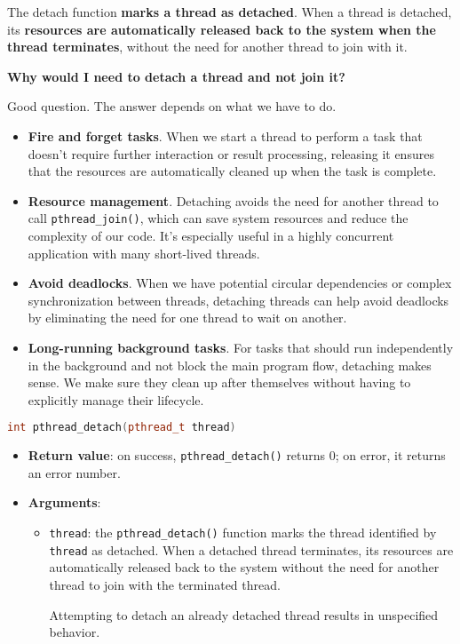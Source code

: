 The detach function \textbf{marks a thread as detached}. When a thread is detached, its \textbf{resources are automatically released back to the system when the thread terminates}, without the need for another thread to join with it.
\begin{flushleft}
    \textcolor{Green3}{ \textbf{Why would I need to detach a thread and not join it?}}
\end{flushleft}
Good question. The answer depends on what we have to do.
\begin{itemize}
    \item \textbf{Fire and forget tasks}. When we start a thread to perform a task that doesn't require further interaction or result processing, releasing it ensures that the resources are automatically cleaned up when the task is complete.

    \item \textbf{Resource management}. Detaching avoids the need for another thread to call \texttt{pthread\_join()}, which can save system resources and reduce the complexity of our code. It's especially useful in a highly concurrent application with many short-lived threads.
    
    \item \textbf{Avoid deadlocks}. When we have potential circular dependencies or complex synchronization between threads, detaching threads can help avoid deadlocks by eliminating the need for one thread to wait on another.
    
    \item \textbf{Long-running background tasks}. For tasks that should run independently in the background and not block the main program flow, detaching makes sense. We make sure they clean up after themselves without having to explicitly manage their lifecycle.
\end{itemize}
\begin{pthreadbox}
    \begin{lstlisting}[language=c++]
int pthread_detach(pthread_t thread)\end{lstlisting}
\end{pthreadbox}
\begin{itemize}
    \item \textbf{Return value}: on success, \texttt{pthread\_detach()} returns 0; on error, it returns an error number.
    \item \textbf{Arguments}:
    \begin{itemize}
        \item \texttt{thread}: the \texttt{pthread\_detach()} function marks the thread identified by \texttt{thread} as detached.  When a detached thread terminates, its resources are automatically released back to the system without the need for another thread to join with the terminated thread.
 
        Attempting to detach an already detached thread results in unspecified behavior.
    \end{itemize}
\end{itemize}

